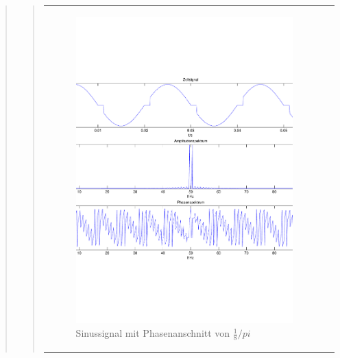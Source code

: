 \begin{quote}
\begin{quote}
\begin{center}
\begin{tabular}{ll}
\begin{minipage}{0.6\textwidth}
                \end{minipage}
                \begin{minipage}{0.6\textwidth}

                    \begin{figure}[H]
                        \label{fig:}
                        \includegraphics[scale=0.3]{./Bilder/Phasenanschnitt18pi.pdf} %
                        \caption{Sinussignal mit Phasenanschnitt von $\frac{1}{8}/pi$}
                    \end{figure}
                \vspace{-1.5em}

                \end{minipage}

            \end{tabular}
            \end{center}


\end{quote}
\end{quote}
